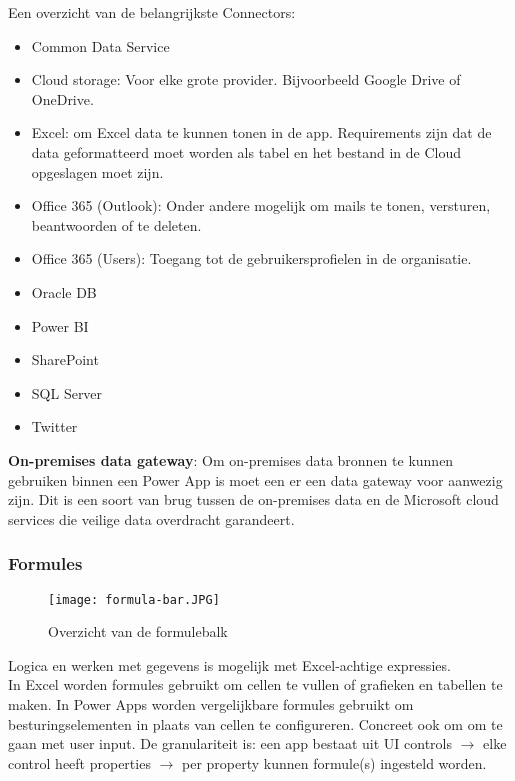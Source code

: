 Een overzicht van de belangrijkste Connectors:
\begin{itemize}
    \item Common Data Service
    \item Cloud storage: Voor elke grote provider. Bijvoorbeeld Google Drive of OneDrive.
    \item Excel: om Excel data te kunnen tonen in de app. Requirements zijn dat de data geformatteerd moet worden als tabel en het bestand in de Cloud opgeslagen moet zijn.
    \item Office 365 (Outlook): Onder andere mogelijk om mails te tonen, versturen, beantwoorden of te deleten.
    \item Office 365 (Users): Toegang tot de gebruikersprofielen in de organisatie.
    \item Oracle DB
    \item Power BI
    \item SharePoint
    \item SQL Server
    \item Twitter
\end{itemize} \autocite{MicrosoftDocs2020b}

\textbf{On-premises data gateway}: Om on-premises data bronnen te kunnen gebruiken binnen een Power App is moet een er een data gateway voor aanwezig zijn. Dit is een soort van brug tussen de on-premises data en de Microsoft cloud services die veilige data overdracht garandeert. \autocite{MicrosoftDocs2019b}

\subsubsection{Formules}

\begin{figure}[h!]
    \texttt{[image: formula-bar.JPG]}
    \caption{Overzicht van de formulebalk \autocite{MicrosoftDocs2019c}}
    \label{fig:msformulebalk}
\end{figure}

Logica en werken met gegevens is mogelijk met Excel-achtige expressies.\\
In Excel worden formules gebruikt om cellen te vullen of grafieken en tabellen te maken. In Power Apps worden vergelijkbare formules gebruikt om besturingselementen in plaats van cellen te configureren. Concreet ook om om te gaan met user input. De granulariteit is: een app bestaat uit UI controls $\rightarrow$ elke control heeft properties $\rightarrow$ per property kunnen formule(s) ingesteld worden. \autocite{MicrosoftDocs2019c}

